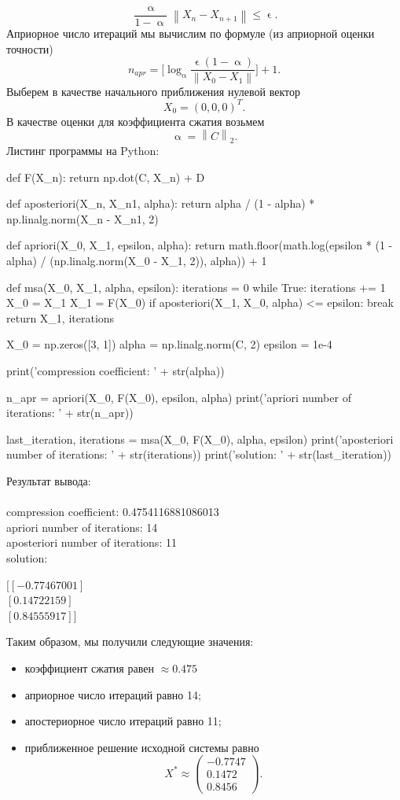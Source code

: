 \documentclass[a4paper, 12pt]{report}
\newcommand\Norm[1]{\left\| #1 \right\|}
\renewcommand{\leq}{\leqslant}
\renewcommand{\alpha}{\upalpha}
\renewcommand{\epsilon}{\upvarepsilon}
\begin{document}
	$$\dfrac{\alpha}{1 - \alpha}\Norm{X_n - X_{n+1}} \leq \epsilon.$$ 
	Априорное число итераций мы вычислим по формуле (из априорной оценки точности) $$n_{apr} = \Big[\log_\alpha \dfrac{\epsilon(1-\alpha)}{\Norm{X_0 - X_1}}\Big] + 1.$$
	Выберем в качестве начального приближения нулевой вектор $$X_0 = (0,0,0)^T.$$
	В качестве оценки для коэффициента сжатия возьмем $$\alpha = \Norm{C}_2.$$
	Листинг программы на Python:
	\begin{python}
	def F(X_n):
        return np.dot(C, X_n) + D

    def aposteriori(X_n, X_n1, alpha):
        return alpha / (1 - alpha) * np.linalg.norm(X_n - X_n1, 2)

    def apriori(X_0, X_1, epsilon, alpha):
        return math.floor(math.log(epsilon * (1 - alpha) / (np.linalg.norm(X_0 - X_1, 2)), alpha)) + 1

    def msa(X_0, X_1, alpha, epsilon):
        iterations = 0
        while True:
            iterations += 1
            X_0 = X_1
            X_1 = F(X_0)
            if aposteriori(X_1, X_0, alpha) <= epsilon:
                break
        return X_1, iterations

    X_0 = np.zeros([3, 1])
    alpha = np.linalg.norm(C, 2)
    epsilon = 1e-4

    print('compression coefficient: ' + str(alpha))

    n_apr = apriori(X_0, F(X_0), epsilon, alpha)
    print('apriori number of iterations: ' + str(n_apr))

    last_iteration, iterations = msa(X_0, F(X_0), alpha, epsilon)
    print('aposteriori number of iterations: ' + str(iterations))
    print('solution: \n' + str(last_iteration))\end{python}
		Результат вывода:\\\\
		compression coefficient:  0.4754116881086013\\
		apriori number of iterations: 14\\
		aposteriori number of iterations: 11\\
		solution: 
		\begin{center}
			$[[-0.77467001]$\\
			$[ 0.14722159]$\\
			$[ 0.84555917]]$
		\end{center}
		Таким образом, мы получили следующие значения:\begin{itemize}
			\item коэффициент сжатия равен $\approx 0.475$
			\item априорное число итераций равно 14;
			\item апостериорное число итераций равно 11;
			\item приближенное решение исходной системы равно $$X^* \approx \begin{pmatrix}
			-0.7747\\
			0.1472\\
			0.8456
			\end{pmatrix}.$$ 
		\end{itemize}
\end{document}
